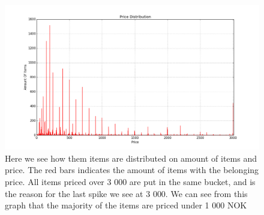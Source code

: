 
    \begin{figure}[H]
        \includegraphics[width=5in]{image/priceDistribution.png}
        \centering
        \caption[Price distribution of items]{Here we see how them items are distributed on amount of items and price. The red bars indicates the amount of items with the belonging price.
        All items priced over 3 000 are put in the same bucket, and is the reason for the last spike we see at 3 000.
        We can see from this graph that the majority of the items are priced under 1 000 NOK}
        \label{figure:ratingdistr}
    \end{figure}

